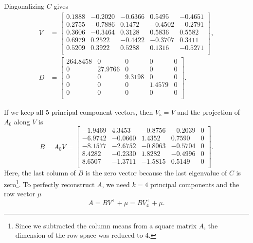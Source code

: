 Diagonalizing \(C\) gives
\begin{align*}
    V &= \begin{bmatrix}
        0.1888 & -0.2020 & -0.6366 &  0.5495 & -0.4651\\
        0.2755 & -0.7886 &  0.1472 & -0.4502 & -0.2791\\
        0.3606 & -0.3464 &  0.3128 &  0.5836 &  0.5582\\
        0.6979 &  0.2522 & -0.4422 & -0.3707 &  0.3411\\
        0.5209 &  0.3922 &  0.5288 &  0.1316 & -0.5271\\
    \end{bmatrix},\\
    D &= \begin{bmatrix}
        264.8458 &       0 &      0 &      0 & 0 \\
                0 & 27.9766 &      0 &      0 & 0 \\
                0 &       0 & 9.3198 &      0 & 0 \\
                0 &       0 &      0 & 1.4579 & 0 \\
                0 &       0 &      0 &      0 & 0 \\
    \end{bmatrix}.
\end{align*}

If we keep all \(5\) principal component vectors, then \(V_5 = V\) and the projection of \(A_0\) along \(V\) is
\begin{equation}B = A_0 V = \begin{bmatrix}
    -1.9469 &  4.3453 & -0.8756 & -0.2039 & 0 \\
    -6.9742 & -0.0660 &  1.4352 &  0.7590 & 0 \\
    -8.1577 & -2.6752 & -0.8063 & -0.5704 & 0 \\
        8.4282 & -0.2330 &  1.8282 & -0.4996 & 0 \\
        8.6507 & -1.3711 & -1.5815 &  0.5149 & 0 \\
\end{bmatrix}.\end{equation}
Here, the last column of \(B\) is the zero vector because the last eigenvalue of \(C\) is zero\footnote{Since we subtracted the column means from a square matrix \(A\), the dimension of the row space was reduced to 4.}.
To perfectly reconstruct \(A\), we need \(k = 4\) principal components and the row vector \(\mu\)
\begin{equation}A = B V^\top + \mu = B V_4^\top + \mu.\end{equation}

